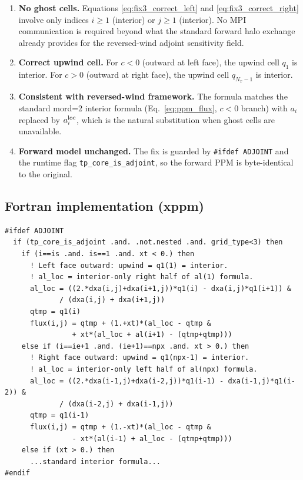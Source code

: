 \documentclass[11pt]{article}
\begin{document}
\begin{enumerate}
  \item \textbf{No ghost cells.} Equations \eqref{eq:fix3_correct_left} and
    \eqref{eq:fix3_correct_right} involve only indices $i \geq 1$ (interior)
    or $j \geq 1$ (interior). No MPI communication is required beyond what
    the standard forward halo exchange already provides for the reversed-wind
    adjoint sensitivity field.
  \item \textbf{Correct upwind cell.} For $c < 0$ (outward at left face), the
    upwind cell $q_1$ is interior. For $c > 0$ (outward at right face), the
    upwind cell $q_{N_x-1}$ is interior.
  \item \textbf{Consistent with reversed-wind framework.} The formula
    matches the standard mord=2 interior formula (Eq.~\ref{eq:ppm_flux},
    $c < 0$ branch) with $a_i$ replaced by $a_i^{\rm loc}$, which is the
    natural substitution when ghost cells are unavailable.
  \item \textbf{Forward model unchanged.} The fix is guarded by
    \texttt{\#ifdef ADJOINT} and the runtime flag \texttt{tp\_core\_is\_adjoint},
    so the forward PPM is byte-identical to the original.
\end{enumerate}

\subsection{Fortran implementation (xppm)}

\begin{lstlisting}
#ifdef ADJOINT
  if (tp_core_is_adjoint .and. .not.nested .and. grid_type<3) then
    if (i==is .and. is==1 .and. xt < 0.) then
      ! Left face outward: upwind = q1(1) = interior.
      ! al_loc = interior-only right half of al(1) formula.
      al_loc = ((2.*dxa(i,j)+dxa(i+1,j))*q1(i) - dxa(i,j)*q1(i+1)) &
             / (dxa(i,j) + dxa(i+1,j))
      qtmp = q1(i)
      flux(i,j) = qtmp + (1.+xt)*(al_loc - qtmp &
                + xt*(al_loc + al(i+1) - (qtmp+qtmp)))
    else if (i==ie+1 .and. (ie+1)==npx .and. xt > 0.) then
      ! Right face outward: upwind = q1(npx-1) = interior.
      ! al_loc = interior-only left half of al(npx) formula.
      al_loc = ((2.*dxa(i-1,j)+dxa(i-2,j))*q1(i-1) - dxa(i-1,j)*q1(i-2)) &
             / (dxa(i-2,j) + dxa(i-1,j))
      qtmp = q1(i-1)
      flux(i,j) = qtmp + (1.-xt)*(al_loc - qtmp &
                - xt*(al(i-1) + al_loc - (qtmp+qtmp)))
    else if (xt > 0.) then
      ...standard interior formula...
#endif
\end{lstlisting}
\end{document}
